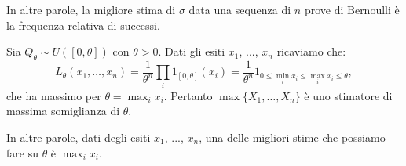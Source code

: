 \begin{multicols*}{2}
\begin{example}
    In altre parole, la migliore stima di $\sigma$ data una sequenza di $n$ prove di Bernoulli è
    la frequenza relativa di successi.
\end{example}

\begin{example}
    Sia $Q_\theta \sim U([0, \theta])$ con $\theta > 0$. Dati gli esiti $x_1$, ..., $x_n$ ricaviamo che:
    \[
        L_\theta(x_1, \ldots, x_n) = \frac{1}{\theta^n} \prod_i 1_{[0, \theta]}(x_i) =
        \frac{1}{\theta^n} 1_{0 \leq \min_i x_i \leq \max_i x_i \leq \theta},
    \]
    che ha massimo per $\theta = \max_i x_i$. Pertanto $\max\{X_1, \ldots, X_n\}$ è uno stimatore
    di massima somiglianza di $\theta$. \smallskip

    In altre parole, dati degli esiti $x_1$, ..., $x_n$, una delle migliori stime che possiamo fare
    su $\theta$ è $\max_i x_i$.
\end{example}

\end{multicols*}
